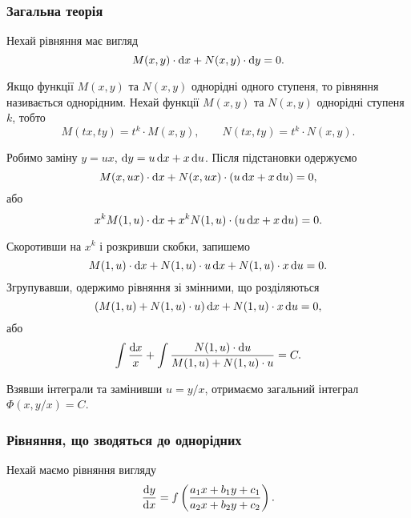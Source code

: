 \subsubsection{Загальна теорія}
Нехай рівняння має вигляд
\begin{equation}
	\label{eq:1.21}
	M(x, y) \cdot \mathop{}\!\mathrm{d}	x + N(x, y) \cdot \mathop{}\!\mathrm{d} y = 0.
\end{equation}

Якщо функції $M(x, y)$ та $N(x, y)$ однорідні одного ступеня, то рівняння називається однорідним. Нехай функції $M(x, y)$ та $N(x, y)$ однорідні ступеня $k$, тобто
\begin{equation}
	\label{eq:1.22}
	M(t x, t y) = t^k \cdot M(x, y), \qquad N(t x, t y) = t^k \cdot N(x, y).
\end{equation}

Робимо заміну $y = u x$, $\mathop{}\!\mathrm{d} y = u \mathop{}\!\mathrm{d} x + x \mathop{}\!\mathrm{d} u$. Після підстановки одержуємо
\begin{equation}
	\label{eq:1.23}
	M(x, u x) \cdot \mathop{}\!\mathrm{d} x + N(x, u x) \cdot (u \mathop{}\!\mathrm{d} x + x \mathop{}\!\mathrm{d} u) = 0,
\end{equation}
або 
\begin{equation}
	\label{eq:1.24}
	x^k M(1, u) \cdot \mathop{}\!\mathrm{d} x + x^k N(1, u) \cdot (u \mathop{}\!\mathrm{d} x + x \mathop{}\!\mathrm{d} u) = 0.
\end{equation}

Скоротивши на $x^k$ і розкривши скобки, запишемо 
\begin{equation}
	\label{eq:1.25}
	M(1, u) \cdot \mathop{}\!\mathrm{d} x + N(1, u) \cdot u \mathop{}\!\mathrm{d} x + N(1, u) \cdot x \mathop{}\!\mathrm{d} u = 0.
\end{equation}
Згрупувавши, одержимо рівняння зі змінними, що розділяються
\begin{equation}
	\label{eq:1.26}
	(M(1, u) + N(1, u) \cdot u) \mathop{}\!\mathrm{d} x + N(1, u) \cdot x \mathop{}\!\mathrm{d} u = 0,
\end{equation}
або 
\begin{equation}
	\label{eq:1.27}
	\int \frac{\mathop{}\!\mathrm{d} x}{x} + \int \frac{N(1, u) \cdot \mathop{}\!\mathrm{d} u}{M(1, u) + N(1, u) \cdot u} = C.
\end{equation}

Взявши інтеграли та замінивши $u = y / x$, отримаємо загальний інтеграл $\Phi(x, y / x) = C$.

\subsubsection{Рівняння, що зводяться до однорідних}

Нехай маємо рівняння вигляду
\begin{equation}
	\label{eq:1.28}
	\frac{\mathop{}\!\mathrm{d} y}{\mathop{}\!\mathrm{d} x} = f \left( \frac{a_1 x + b_1 y + c_1}{a_2 x + b_2 y + c_2} \right).
\end{equation}

